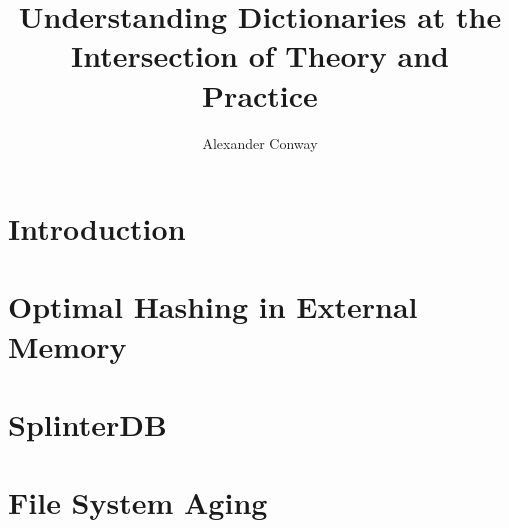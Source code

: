 \documentclass{ruthesis}
\begin{document}
\phd

\title{Understanding Dictionaries at the Intersection of Theory and Practice}
\author{Alexander Conway}



\beforepreface
{}
\dedication{The body of the dedication}
\afterpreface

\chapter{Introduction}


\chapter{Optimal Hashing in External Memory}








\chapter{SplinterDB}









\chapter{File System Aging}











\end{document}
